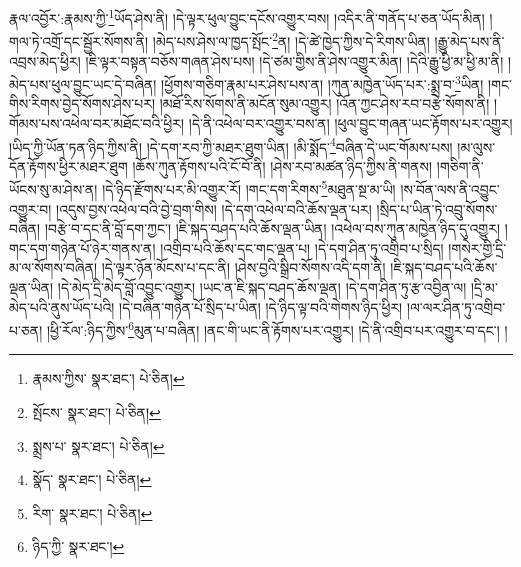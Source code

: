 རྣལ་འབྱོར་:རྣམས་ཀྱི་\footnote{རྣམས་ཀྱིས་  སྣར་ཐང་།  པེ་ཅིན། }ཡོད་ཤེས་ནི། །དེ་ལྟར་ཕུལ་བྱུང་དངོས་འགྱུར་བས། །འདིར་ནི་གནོད་པ་ཅན་ཡོད་མིན། །གལ་ཏེ་འགྲོ་དང་སྦྱོར་སོགས་ནི། །མེད་པས་ཤེས་ལ་ཁྱད་སྤོང་\footnote{སྤོངས་  སྣར་ཐང་།  པེ་ཅིན། }ན། །དེ་ཚེ་ཁྱེད་ཀྱིས་དེ་རིགས་ཡིན། །རྒྱུ་མེད་པས་ནི་འབྲས་མེད་ཕྱིར། །ཇི་ལྟར་བསྟན་བཅོས་གཞན་ཤེས་པས། །དེ་ཙམ་གྱིས་ནི་ཤེས་འགྱུར་མིན། །དེའི་རྒྱུ་ཕྱི་མ་ཕྱི་མ་ནི། །མེད་པས་ཕུལ་བྱུང་ཡང་དེ་བཞིན། །ཕྱོགས་གཅིག་རྣམ་པར་ཤེས་པས་ན། །ཀུན་མཁྱེན་ཡོད་པར་:སྨྲ་བ་\footnote{སྨྲས་པ་  སྣར་ཐང་།  པེ་ཅིན། }ཡིན། །གང་གིས་རིགས་བྱེད་སོགས་ཤེས་པར། །མཐོ་རིས་སོགས་ནི་མངོན་སུམ་འགྱུར། །འོན་ཀྱང་ཤེས་རབ་བརྩེ་སོགས་ནི། །གོམས་པས་འཕེལ་བར་མཐོང་བའི་ཕྱིར། །དེ་ནི་འཕེལ་བར་འགྱུར་བས་ན། །ཕུལ་བྱུང་གཞན་ཡང་རྟོགས་པར་འགྱུར། །ཡིད་ཀྱི་ཡོན་ཏན་ཉིད་ཀྱིས་ནི། །དེ་དག་རབ་ཀྱི་མཐར་ཐུག་ཡིན། །མི་སྨོད་\footnote{སྣོད་  སྣར་ཐང་།  པེ་ཅིན། }བཞིན་དེ་ཡང་གོམས་པས། །མ་ལུས་དོན་རྟོགས་ཕྱིར་མཐར་ཐུག །ཆོས་ཀུན་རྟོགས་པའི་ངོ་བོ་ནི། །ཤེས་རབ་མཚན་ཉིད་ཀྱིས་ནི་གནས། །གཅིག་ནི་ཡོངས་སུ་མ་ཤེས་ན། །དེ་ཉིད་རྫོགས་པར་མི་འགྱུར་རོ། །གང་དག་རིགས་\footnote{རིག་  སྣར་ཐང་།  པེ་ཅིན། }མཐུན་སྔ་མ་ཡི། །ས་བོན་ལས་ནི་འབྱུང་འགྱུར་བ། །འདུས་བྱས་འཕེལ་བའི་བྱེ་བྲག་གིས། །དེ་དག་འཕེལ་བའི་ཆོས་ལྡན་པར། །སྲིད་པ་ཡིན་ཏེ་འབྲུ་སོགས་བཞིན། །བརྩེ་བ་དང་ནི་བློ་དག་ཀྱང་། །ཇི་སྐད་བཤད་པའི་ཆོས་ལྡན་ཡིན། །འཕེལ་བས་ཀུན་མཁྱེན་ཉིད་དུ་འགྱུར། །གང་དག་གཉེན་པོ་ཉེར་གནས་ན། །འགྲིབ་པའི་ཆོས་དང་གང་ལྡན་པ། །དེ་དག་ཤིན་ཏུ་འགྲིབ་པ་སྲིད། །གསེར་གྱི་དྲི་མ་ལ་སོགས་བཞིན། །དེ་ལྟར་ཉོན་མོངས་པ་དང་ནི། །ཤེས་བྱའི་སྒྲིབ་སོགས་འདི་དག་ནི། །ཇི་སྐད་བཤད་པའི་ཆོས་ལྡན་ཡིན། །དེ་མེད་དྲི་མེད་བློ་འབྱུང་འགྱུར། །ཡང་ན་ཇི་སྐད་བཤད་ཆོས་ལྡན། །དེ་དག་ཤིན་ཏུ་རྩ་འབྱིན་ལ། །དྲི་མ་མེད་པའི་ནུས་ཡོད་པའི། །དེ་བཞིན་གཉེན་པོ་སྲིད་པ་ཡིན། །དེ་ཉིད་ལྟ་བའི་གེགས་ཉིད་ཕྱིར། །ལ་ལར་ཤིན་ཏུ་འགྲིབ་པ་ཅན། །ཕྱི་རོལ་:ཉིད་ཀྱིས་\footnote{ཉིད་ཀྱི་  སྣར་ཐང་། }མུན་པ་བཞིན། །ནང་གི་ཡང་ནི་རྟོགས་པར་འགྱུར། །དེ་ནི་འགྲིབ་པར་འགྱུར་བ་དང་། །
